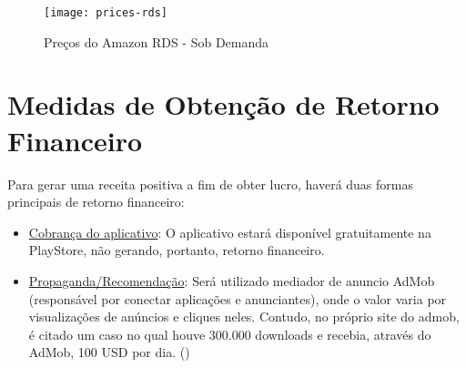 \begin{figure}[h]
  \centering
  \texttt{[image: prices-rds]}
  \caption{Preços do Amazon RDS - Sob Demanda}
  \label{fig:prices-rds}
\end{figure}	

\section{Medidas de Obtenção de Retorno Financeiro}

Para gerar uma receita positiva a fim de obter lucro, haverá duas formas principais de retorno financeiro:
\begin{itemize}
	\item \underline{Cobrança do aplicativo}: O aplicativo estará disponível gratuitamente na PlayStore, não gerando, portanto, retorno financeiro.
	\item \underline{Propaganda/Recomendação}: Será utilizado mediador de anuncio AdMob (responsável por conectar aplicações e anunciantes), onde o valor varia por visualizações de anúncios e cliques neles. Contudo, no próprio site do admob, é citado um caso no qual houve 300.000 downloads e recebia, através do AdMob, 100 USD por dia. (\cite{google_admob})
\end{itemize}

